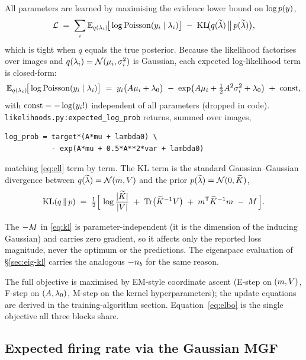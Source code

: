 All parameters are learned by maximising the evidence lower bound on
$\log p(y)$,
\begin{equation}
  \mathcal{L} \;=\; \sum_i \mathbb{E}_{q(\lambda_i)}\!\big[\log \mathrm{Poisson}(y_i\mid\lambda_i)\big]
    \;-\; \mathrm{KL}\!\big(q(\widetilde{\lambda})\,\big\|\,p(\widetilde{\lambda})\big),
  \label{eq:elbo}
\end{equation}
which is tight when $q$ equals the true posterior. Because the likelihood
factorises over images and $q(\lambda_i)=\mathcal{N}(\mu_i,\sigma^{2}_i)$ is Gaussian, each
expected log-likelihood term is closed-form:
\begin{equation}
  \mathbb{E}_{q(\lambda_i)}\!\big[\log \mathrm{Poisson}(y_i\mid\lambda_i)\big]
    \;=\; y_i\big(A\mu_i+\lambda_{0}\big)
      \;-\; \exp\!\big(A\mu_i+\tfrac12A^2\sigma^{2}_i+\lambda_{0}\big)
      \;+\; \text{const},
  \label{eq:ell}
\end{equation}
with $\text{const}=-\log(y_i!)$ independent of all parameters (dropped in
code). \texttt{likelihoods.py:\allowbreak expected\_log\_prob} returns, summed over images,
\begin{lstlisting}
log_prob = target*(A*mu + lambda0) \
           - exp(A*mu + 0.5*A**2*var + lambda0)
\end{lstlisting}
matching \eqref{eq:ell} term by term. The KL term is the standard
Gaussian--Gaussian divergence between $q(\widetilde{\lambda})=\mathcal{N}(m,V)$ and the prior
$p(\widetilde{\lambda})=\mathcal{N}(0,\widetilde{K})$,
\begin{equation}
  \mathrm{KL}(q\,\|\,p) \;=\; \tfrac12\Big[\,
    \log\frac{\lvert\widetilde{K}\rvert}{\lvert V\rvert}
    \;+\; \operatorname{Tr}\!\big(\widetilde{K}^{-1}V\big)
    \;+\; m^{\mathsf{T}}\widetilde{K}^{-1}m
    \;-\; M \,\Big].
  \label{eq:kl}
\end{equation}

\begin{remark}
The $-M$ in \eqref{eq:kl} is parameter-independent (it is the dimension of
the inducing Gaussian) and carries zero gradient, so it affects only the reported
loss magnitude, never the optimum or the predictions. The eigenspace evaluation
of \S\ref{sec:eig-kl} carries the analogous $-n_{b}$ for the same reason.
\end{remark}

The full objective is maximised by EM-style coordinate ascent
(E-step on $(m,V)$, F-step on $(A,\lambda_{0})$, M-step on the kernel
hyperparameters); the update equations are derived in the training-algorithm
section. Equation~\eqref{eq:elbo} is the single objective all three blocks share.

\subsection{Expected firing rate via the Gaussian MGF}\label{sec:fbar}

